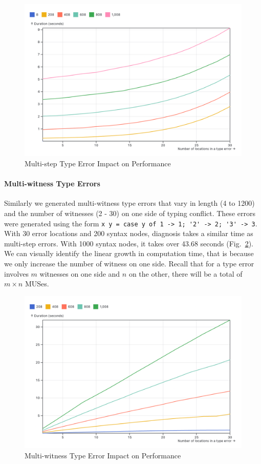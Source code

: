 \documentclass[pdflatex,sn-mathphys-num]{sn-jnl}%
\begin{document}
\begin{figure}[ht]
    \centering
    \includegraphics[width=0.8\linewidth]{images/multi-step.png}
    \caption{Multi-step Type Error Impact on Performance}
    \label{fig:multi-step-time}
\end{figure}

\paragraph{Multi-witness Type Errors}

Similarly we generated multi-witness type errors that vary in length (4 to 1200) and the number of witnesses (2 - 30) on one side of typing conflict. These errors were generated using the form \lstinline{x y = case y of 1 -> 1; '2' -> 2; '3' -> 3}. With 30 error locations and 200 syntax nodes, diagnosis takes a similar time as multi-step errors. With 1000 syntax nodes, it takes over 43.68 seconds (Fig.~\ref{fig:multi-witness-time}).  We can visually identify the linear growth in computation time, that is because we only increase the number of witness on one side. Recall that for a type error involves $m$ witnesses on one side and $n$ on the other, there will be a total of $m \times n$ MUSes.

\begin{figure}[ht]
    \centering
    \includegraphics[width=0.8\linewidth]{images/multi-witness-time.png}
    \caption{Multi-witness Type Error Impact on Performance}
    \label{fig:multi-witness-time}
\end{figure}
\end{document}
